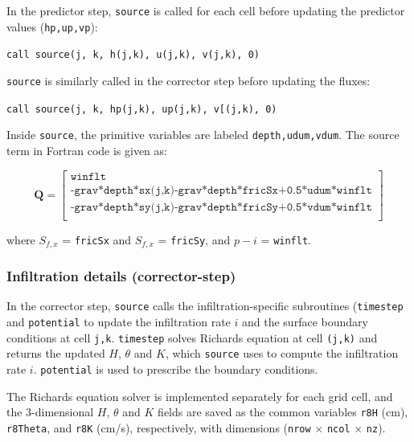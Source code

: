 \documentclass{article}
\newcommand{\code}[1]{\texttt{#1}}
\begin{document}
In the predictor step, \code{source} is called for each cell before updating the predictor values (\code{hp,up,vp}):
\begin{center}
\code{call source(j, k, h(j,k), u(j,k), v(j,k), 0)}
\end{center}

 
\code{source} is similarly  called in the corrector step before updating the fluxes: 
\begin{center}
\code{call source(j, k, hp(j,k), up(j,k), v[(j,k), 0)}
\end{center}

Inside \code{source}, the primitive variables are labeled \code{depth,udum,vdum}. 
The source term in Fortran code is given as:

\[ \mathbf{Q} = 
 \begin{bmatrix}
	\code{winflt}  \\[.1cm]
	\code{-grav*depth*sx(j,k)-grav*depth*fricSx+0.5*udum*winflt}\\[.1cm]
	\code{-grav*depth*sy(j,k)-grav*depth*fricSy+0.5*vdum*winflt}\\[.1cm]
\end{bmatrix} 
\]

where $S_{f,x}$ = \code{fricSx} and  $S_{f,x}$ = \code{fricSy}, and $p-i$ = \code{winflt}.


\subsubsection*{Infiltration details (corrector-step)}

In the corrector step, \code{source} calls the infiltration-specific subroutines (\code{timestep} and \code{potential} to update the infiltration rate $i$ and the surface boundary conditions at cell \code{j,k}. 
\code{timestep} solves Richards equation at cell \code{(j,k)} and returns the updated $H$, $\theta$ and $K$, which \code{source} uses to compute the infiltration rate $i$. \code{potential} is used to prescribe the boundary conditions. 

 The Richards equation solver is implemented separately for each grid cell, and the 3-dimensional $H$, $\theta$ and $K$  fields are saved as the common variables \code{r8H} (cm), \code{r8Theta}, and  \code{r8K} (cm/s), respectively, with dimensions (\code{nrow} $\times$ \code{ncol} $\times$ \code{nz}).\\ 

\end{document}
